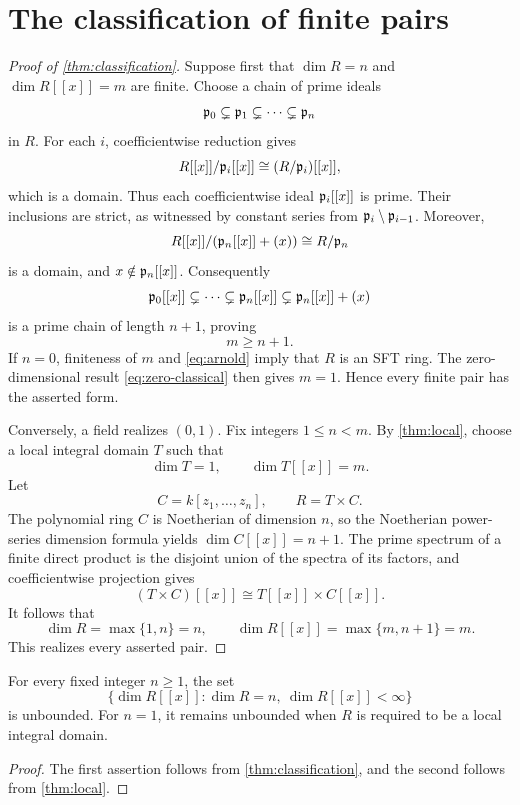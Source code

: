 \section{The classification of finite pairs}\label{sec:classification}

\begin{proof}[Proof of \cref{thm:classification}]
Suppose first that $\dim R=n$ and $\dim R[[x]]=m$ are finite.
Choose a chain of prime ideals
\[
  \mathfrak p_0\subsetneq\mathfrak p_1\subsetneq\cdots\subsetneq\mathfrak p_n
\]
in $R$.  For each $i$, coefficientwise reduction gives
\[
  R[[x]]/\mathfrak p_i[[x]]\cong (R/\mathfrak p_i)[[x]],
\]
which is a domain.  Thus each coefficientwise ideal $\mathfrak p_i[[x]]$
is prime.  Their inclusions are strict, as witnessed by constant
series from $\mathfrak p_i\setminus\mathfrak p_{i-1}$.  Moreover,
\[
  R[[x]]/(\mathfrak p_n[[x]]+(x))\cong R/\mathfrak p_n
\]
is a domain, and $x\notin\mathfrak p_n[[x]]$.  Consequently
\[
  \mathfrak p_0[[x]]\subsetneq\cdots\subsetneq\mathfrak p_n[[x]]
  \subsetneq\mathfrak p_n[[x]]+(x)
\]
is a prime chain of length $n+1$, proving
\begin{equation}\label{eq:necessary-lower-bound}
  m\ge n+1.
\end{equation}
If $n=0$, finiteness of $m$ and \cref{eq:arnold} imply that $R$
is an SFT ring.  The zero-dimensional result
\cref{eq:zero-classical} then gives $m=1$.  Hence every finite
pair has the asserted form.

Conversely, a field realizes $(0,1)$.  Fix integers
$1\le n<m$.  By \cref{thm:local}, choose a local integral domain
$T$ such that
\[
  \dim T=1,\qquad \dim T[[x]]=m.
\]
Let
\[
  C=k[z_1,\ldots,z_n],\qquad R=T\times C.
\]
The polynomial ring $C$ is Noetherian of dimension $n$, so the
Noetherian power-series dimension formula yields
$\dim C[[x]]=n+1$.  The prime spectrum of a finite direct
product is the disjoint union of the spectra of its factors,
and coefficientwise projection gives
\[
  (T\times C)[[x]]\cong T[[x]]\times C[[x]].
\]
It follows that
\[
  \dim R=\max\{1,n\}=n,\qquad
  \dim R[[x]]=\max\{m,n+1\}=m.
\]
This realizes every asserted pair.
\end{proof}

\begin{corollary}\label{cor:no-finite-upper-bound}
For every fixed integer $n\ge1$, the set
\[
  \bigl\{\dim R[[x]]:\dim R=n,\ \dim R[[x]]<\infty\bigr\}
\]
is unbounded.  For $n=1$, it remains unbounded when $R$ is
required to be a local integral domain.
\end{corollary}

\begin{proof}
The first assertion follows from \cref{thm:classification},
and the second follows from \cref{thm:local}.
\end{proof}
